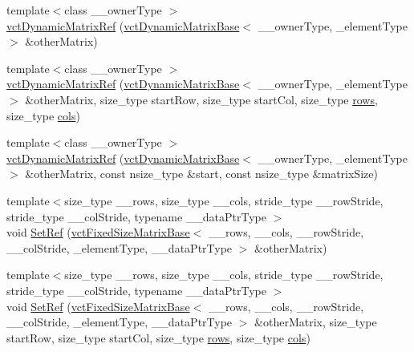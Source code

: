 \begin{DoxyCompactItemize}
\item 
{\footnotesize template$<$class \+\_\+\+\_\+owner\+Type $>$ }\\\hyperlink{classvct_dynamic_matrix_ref_a823a5b7514927ecf3b8cff59566edff0}{vct\+Dynamic\+Matrix\+Ref} (\hyperlink{classvct_dynamic_matrix_base}{vct\+Dynamic\+Matrix\+Base}$<$ \+\_\+\+\_\+owner\+Type, \+\_\+element\+Type $>$ \&other\+Matrix)
\item 
{\footnotesize template$<$class \+\_\+\+\_\+owner\+Type $>$ }\\\hyperlink{classvct_dynamic_matrix_ref_a9fd83d8b3c73759ead58f9344179256e}{vct\+Dynamic\+Matrix\+Ref} (\hyperlink{classvct_dynamic_matrix_base}{vct\+Dynamic\+Matrix\+Base}$<$ \+\_\+\+\_\+owner\+Type, \+\_\+element\+Type $>$ \&other\+Matrix, size\+\_\+type start\+Row, size\+\_\+type start\+Col, size\+\_\+type \hyperlink{classvct_dynamic_const_matrix_base_a5eac13be2207ebeb8766cde379d73438}{rows}, size\+\_\+type \hyperlink{classvct_dynamic_const_matrix_base_aa6c51d41a100da49a7e7ac7edb20ecd9}{cols})
\item 
{\footnotesize template$<$class \+\_\+\+\_\+owner\+Type $>$ }\\\hyperlink{classvct_dynamic_matrix_ref_af36a252093955d288f867e1837b5ffaa}{vct\+Dynamic\+Matrix\+Ref} (\hyperlink{classvct_dynamic_matrix_base}{vct\+Dynamic\+Matrix\+Base}$<$ \+\_\+\+\_\+owner\+Type, \+\_\+element\+Type $>$ \&other\+Matrix, const nsize\+\_\+type \&start, const nsize\+\_\+type \&matrix\+Size)
\item 
{\footnotesize template$<$size\+\_\+type \+\_\+\+\_\+rows, size\+\_\+type \+\_\+\+\_\+cols, stride\+\_\+type \+\_\+\+\_\+row\+Stride, stride\+\_\+type \+\_\+\+\_\+col\+Stride, typename \+\_\+\+\_\+data\+Ptr\+Type $>$ }\\void \hyperlink{classvct_dynamic_matrix_ref_ac002b99788bddb17f831362362d3272c}{Set\+Ref} (\hyperlink{classvct_fixed_size_matrix_base}{vct\+Fixed\+Size\+Matrix\+Base}$<$ \+\_\+\+\_\+rows, \+\_\+\+\_\+cols, \+\_\+\+\_\+row\+Stride, \+\_\+\+\_\+col\+Stride, \+\_\+element\+Type, \+\_\+\+\_\+data\+Ptr\+Type $>$ \&other\+Matrix)
\item 
{\footnotesize template$<$size\+\_\+type \+\_\+\+\_\+rows, size\+\_\+type \+\_\+\+\_\+cols, stride\+\_\+type \+\_\+\+\_\+row\+Stride, stride\+\_\+type \+\_\+\+\_\+col\+Stride, typename \+\_\+\+\_\+data\+Ptr\+Type $>$ }\\void \hyperlink{classvct_dynamic_matrix_ref_ad61bf60c1e01732a4513a7cb8a485a1e}{Set\+Ref} (\hyperlink{classvct_fixed_size_matrix_base}{vct\+Fixed\+Size\+Matrix\+Base}$<$ \+\_\+\+\_\+rows, \+\_\+\+\_\+cols, \+\_\+\+\_\+row\+Stride, \+\_\+\+\_\+col\+Stride, \+\_\+element\+Type, \+\_\+\+\_\+data\+Ptr\+Type $>$ \&other\+Matrix, size\+\_\+type start\+Row, size\+\_\+type start\+Col, size\+\_\+type \hyperlink{classvct_dynamic_const_matrix_base_a5eac13be2207ebeb8766cde379d73438}{rows}, size\+\_\+type \hyperlink{classvct_dynamic_const_matrix_base_aa6c51d41a100da49a7e7ac7edb20ecd9}{cols})

\end{DoxyCompactItemize}
